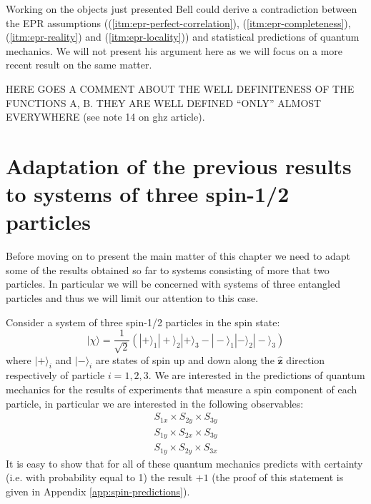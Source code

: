 \begin{observation}
Working on the objects just presented Bell \cite{Bell1964} could derive a contradiction between the EPR assumptions ((\ref{itm:epr-perfect-correlation}), (\ref{itm:epr-completeness}), (\ref{itm:epr-reality}) and (\ref{itm:epr-locality})) and statistical predictions of quantum mechanics. We will not present his argument here as we will focus on a more recent result on the same matter.
\end{observation}

\begin{observation}
  HERE GOES A COMMENT ABOUT THE WELL DEFINITENESS OF THE FUNCTIONS A, B. THEY ARE WELL DEFINED ``ONLY'' ALMOST EVERYWHERE (see note 14 on ghz article).
\end{observation}


\section{Adaptation of the previous results to systems of three spin-1/2 particles}
\label{sec:adaptation-to-3-particles}
Before moving on to present the main matter of this chapter we need to adapt some of the results obtained so far to systems consisting of more that two particles. In particular we will be concerned with systems of three entangled particles and thus we will limit our attention to this case.%

Consider a system of three spin-1/2 particles in the spin state:
\begin{equation}
  |\chi\rangle = \frac{1}{\sqrt{2}} \left( |+\rangle_1 |+\rangle_2 |+\rangle_3 - |-\rangle_1 |-\rangle_2 |-\rangle_3 \right)
  \label{eq:ghz-state}
\end{equation}
where $|+\rangle_i$ and $|-\rangle_i$ are states of spin up and down along the $\mathbf{\hat{z}}$ direction respectively of particle $i = 1, 2, 3$.
We are interested in the predictions of quantum mechanics for the results of experiments that measure a spin component of each particle, in particular we are interested in the following observables:
\begin{equation}
  \begin{split}
    S_{1x} \times S_{2y} \times S_{3y}\\
    S_{1y} \times S_{2x} \times S_{3y}\\
    S_{1y} \times S_{2y} \times S_{3x}
  \end{split}
  \label{eq:xyy-observables}
\end{equation}
It is easy to show that for all of these quantum mechanics predicts with certainty (i.e. with probability equal to 1) the result $+ 1$ (the proof of this statement is given in Appendix \ref{app:spin-predictions}).

